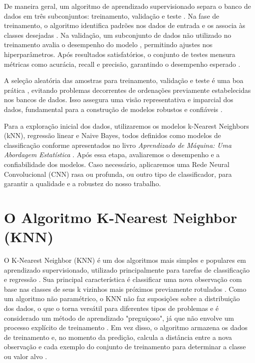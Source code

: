De maneira geral, um algoritmo de aprendizado supervisionado separa o banco de dados em três subconjuntos: treinamento, validação e teste \cite{izbicki2020}. Na fase de treinamento, o algoritmo identifica padrões nos dados de entrada e os associa às classes desejadas \cite{izbicki2020}. Na validação, um subconjunto de dados não utilizado no treinamento avalia o desempenho do modelo \cite{izbicki2020}, permitindo ajustes nos hiperparâmetros. Após resultados satisfatórios, o conjunto de testes mensura métricas como acurácia, recall e precisão, garantindo o desempenho esperado \cite{izbicki2020}.

A seleção aleatória das amostras para treinamento, validação e teste é uma boa prática \cite{izbicki2020}, evitando problemas decorrentes de ordenações previamente estabelecidas nos bancos de dados. Isso assegura uma visão representativa e imparcial dos dados, fundamental para a construção de modelos robustos e confiáveis \cite{izbicki2020}.

Para a exploração inicial dos dados, utilizaremos os modelos k-Nearest Neighbors (kNN), regressão linear e Naive Bayes, todos definidos como modelos de classificação conforme apresentados no livro \textit{Aprendizado de Máquina: Uma Abordagem Estatística} . Após essa etapa, avaliaremos o desempenho e a confiabilidade dos modelos. Caso necessário, aplicaremos uma Rede Neural Convolucional (CNN) rasa ou profunda, ou outro tipo de classificador, para garantir a qualidade e a robustez do nosso trabalho.

\section{O Algoritmo K-Nearest Neighbor (KNN)}
O K-Nearest Neighbor (KNN) é um dos algoritmos mais simples e populares em aprendizado supervisionado, utilizado principalmente para tarefas de classificação e regressão \cite{zhang2016}. Sua principal característica é classificar uma nova observação com base nas classes de seus k vizinhos mais próximos previamente rotulados \cite{zhang2016}. Como um algoritmo não paramétrico, o KNN não faz suposições sobre a distribuição dos dados, o que o torna versátil para diferentes tipos de problemas e é considerado um método de aprendizado "preguiçoso", já que não envolve um processo explícito de treinamento \cite{zhang2016}. Em vez disso, o algoritmo armazena os dados de treinamento e, no momento da predição, calcula a distância entre a nova observação e cada exemplo do conjunto de treinamento para determinar a classe ou valor alvo \cite{zhang2016}.

